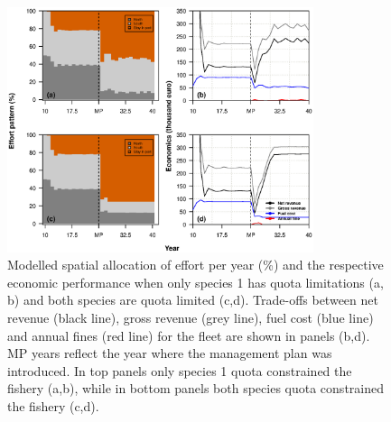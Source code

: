 \documentclass[12pt,oneline,a4paper,numbib]{ouparticle}
\numberwithin{equation}{subsection} %
\begin{document}
\begin{figure}[!ht]
\centering
\includegraphics[width=0.8\textwidth]{Figures/Efforteconomics.eps} 
\caption{Modelled spatial allocation of effort per year (\%) and the respective economic performance when only species 1 has quota limitations (a, b) and both species are quota limited (c,d). Trade-offs between net revenue (black line), gross revenue (grey line), fuel cost (blue line) and annual fines (red line) for the fleet are shown in panels (b,d). MP years reflect the year where the management plan was introduced. In top panels only species 1 quota constrained the fishery (a,b), while in bottom panels both species quota constrained the fishery (c,d).}
\label{f:effort}
\end{figure}
\end{document}
